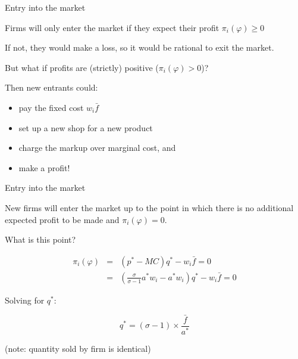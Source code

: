 \documentclass[notes,11pt, aspectratio=169, xcolor=table]{beamer}
\newenvironment{wideitemize}{\itemize\addtolength{\itemsep}{10pt}}{\enditemize}
\begin{document}
\begin{frame}{Entry into the market}

\begin{wideitemize}
    \item Firms will only enter the market if they expect their profit $\pi_i(\varphi) \ge0$
    \item<2-> If not, they would make a loss, so it would be rational to exit the market.
    \item<3-> But what if profits are (strictly) positive ($\pi_i(\varphi) >0$)?

    \item<4-> Then new entrants could:

    \begin{itemize}
        \item<5-> pay the fixed cost $w_i \bar{f}$
        \item<6-> set up a new shop for a new product
        \item<7-> charge the markup over marginal cost, and
        \item<8-> make a profit!
    \end{itemize}
\end{wideitemize}    
\end{frame}

\begin{frame}{Entry into the market}

    \begin{wideitemize}
    \item New firms will enter the market up to the point in which there is no additional expected profit to be made and $\pi_i(\varphi) =0$.

    \item<2-> What is this point?
    
\begin{eqnarray*}
    \pi_i(\varphi) &=& (p^* - MC) q^* - w_i \bar{f} = 0\\
    &=& \left(\frac{\sigma}{\sigma -1}a^*w_i - a^* w_i\right) q^* - w_i \bar{f} =0  
\end{eqnarray*}

    \item<3-> Solving for $q^*$:

    \begin{equation*}
    \boxed{
        q^* = (\sigma-1) \times \frac{\bar{f}}{a^*}
    }
    \end{equation*}

    (note: quantity sold by firm is identical) 

    \end{wideitemize}
    
\end{frame}
\end{document}
